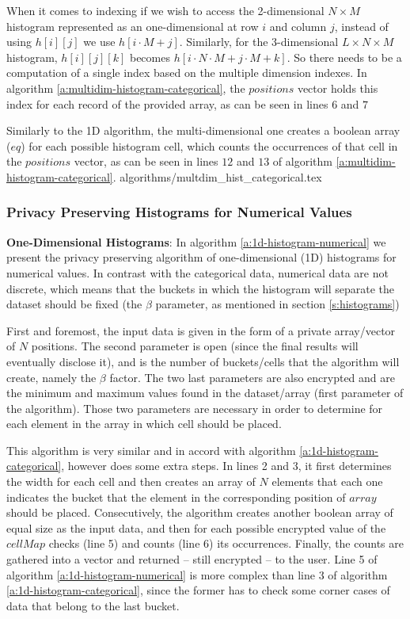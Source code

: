 When it comes to indexing if we wish to access the 2-dimensional $N \times M$ histogram represented as an one-dimensional at row $ i $ and column $ j $, instead of using $h[i][j]$ we use $h[i \cdot M + j]$.
Similarly, for the 3-dimensional $L \times N \times M$ histogram, $h[i][j][k]$ becomes $h[i \cdot N \cdot M + j \cdot M + k]$. So there needs to be a computation of a single index based on the multiple dimension indexes. In algorithm \ref{a:multidim-histogram-categorical}, the $positions$ vector holds this index for each record of the provided array, as can be seen in lines $ 6 $ and $ 7 $

Similarly to the 1D algorithm, the multi-dimensional one creates a boolean array ($eq$) for each possible histogram cell, which counts the occurrences of that cell in the $positions$ vector, as can be seen in lines $12$ and $13$ of algorithm \ref{a:multidim-histogram-categorical}.
{algorithms/multdim_hist_categorical.tex}



\subsubsection{Privacy Preserving Histograms for Numerical Values}\label{sss:histogram-numerical}

\textbf{One-Dimensional Histograms}: In algorithm \ref{a:1d-histogram-numerical} we present the privacy preserving algorithm of one-dimensional (1D) histograms for numerical values.
In contrast with the categorical data, numerical data are not discrete, which means that the buckets in which the histogram will separate the dataset should be fixed (the $\beta$ parameter, as mentioned in section \ref{s:histograms})

First and foremost, the input data is given in the form of a private array/vector of $N$ positions.
The second parameter is open (since the final results will eventually disclose it), and is the number of buckets/cells that the algorithm will create, namely the $\beta$ factor.
The two last parameters are also encrypted and are the minimum and maximum values found in the dataset/array (first parameter of the algorithm).
Those two parameters are necessary in order to determine for each element in the array in which cell should be placed.

This algorithm is very similar and in accord with algorithm \ref{a:1d-histogram-categorical}, however does some extra steps.
In lines 2 and 3, it first determines the width for each cell and then creates an array of $N$ elements that each one indicates the bucket that the element in the corresponding position of $array$ should be placed.
Consecutively, the algorithm creates another boolean array of equal size as the input data, and then for each possible encrypted value of the $cellMap$ checks (line 5) and counts (line 6) its occurrences.
Finally, the counts are gathered into a vector and returned -- still encrypted -- to the user.
Line 5 of algorithm \ref{a:1d-histogram-numerical} is more complex than line 3 of algorithm \ref{a:1d-histogram-categorical}, since the former has to check some corner cases of data that belong to the last bucket.

